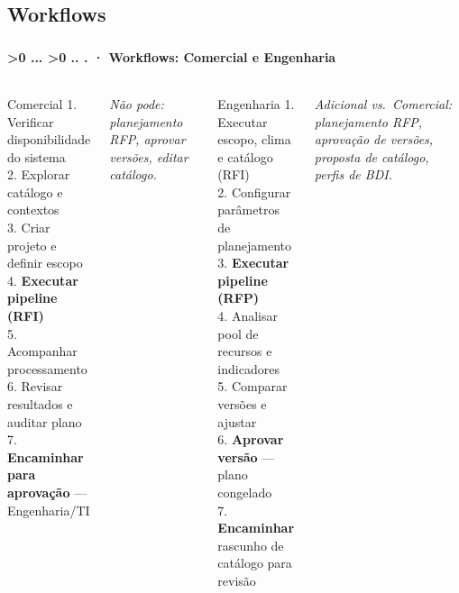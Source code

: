 \documentclass[aspectratio=169,10pt]{beamer}
\newcounter{mlc3}[subsection]
\newcounter{mlc4}[mlc3]
\newcommand{\pathnum}{%
  \ifnum\value{mlc4}>0
    \thesection.\thesubsection.\arabic{mlc3}.\arabic{mlc4}%
  \else\ifnum\value{mlc3}>0
    \thesection.\thesubsection.\arabic{mlc3}%
  \else
    \thesection.\thesubsection%
  \fi\fi
}
\newcommand{\mtitle}[1]{%
  \frametitle{\insertsection}%
  \framesubtitle{\pathnum\;·\; #1}}
\begin{document}
\subsection{Workflows}
\begin{frame}
  \mtitle{Workflows: Comercial e Engenharia}
  \begin{columns}[T]
    \begin{block}{Comercial}
      \scriptsize
      1. Verificar disponibilidade do sistema\\
      2. Explorar catálogo e contextos\\
      3. Criar projeto e definir escopo\\
      4. \textbf{Executar pipeline (RFI)}\\
      5. Acompanhar processamento\\
      6. Revisar resultados e auditar plano\\
      7. \textbf{Encaminhar para aprovação} --- Engenharia/TI
    \end{block}
    \vspace{4pt}
    {\scriptsize\itshape Não pode: planejamento RFP, aprovar versões,
    editar catálogo.}
    \begin{block}{Engenharia}
      \scriptsize
      1. Executar escopo, clima e catálogo (RFI)\\
      2. Configurar parâmetros de planejamento\\
      3. \textbf{Executar pipeline (RFP)}\\
      4. Analisar pool de recursos e indicadores\\
      5. Comparar versões e ajustar\\
      6. \textbf{Aprovar versão} --- plano congelado\\
      7. \textbf{Encaminhar} rascunho de catálogo para revisão
    \end{block}
    \vspace{4pt}
    {\scriptsize\itshape Adicional vs.\ Comercial: planejamento RFP,
    aprovação de versões, proposta de catálogo, perfis de BDI.}
  \end{columns}
\end{frame}
\end{document}
